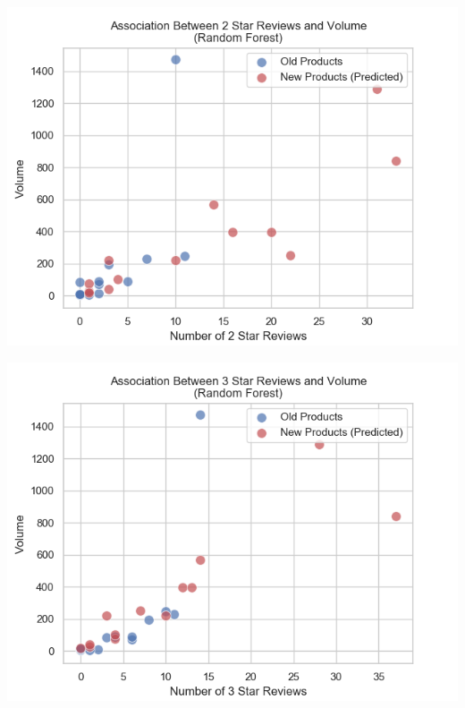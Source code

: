 \documentclass[12pt,a4paper,leqno]{report}
\theoremstyle{plain}
\theoremstyle{definition}
\theoremstyle{remark}
\begin{document}
\bigskip
{
    \centering
    \includegraphics[width=\textwidth,height=\textheight,keepaspectratio]{volume_x2StarReviews_relation.png}
    \par
}
\bigskip

\bigskip
{
    \centering
    \includegraphics[width=\textwidth,height=\textheight,keepaspectratio]{volume_x3StarReviews_relation.png}
    \par
}
\bigskip
\end{document}
